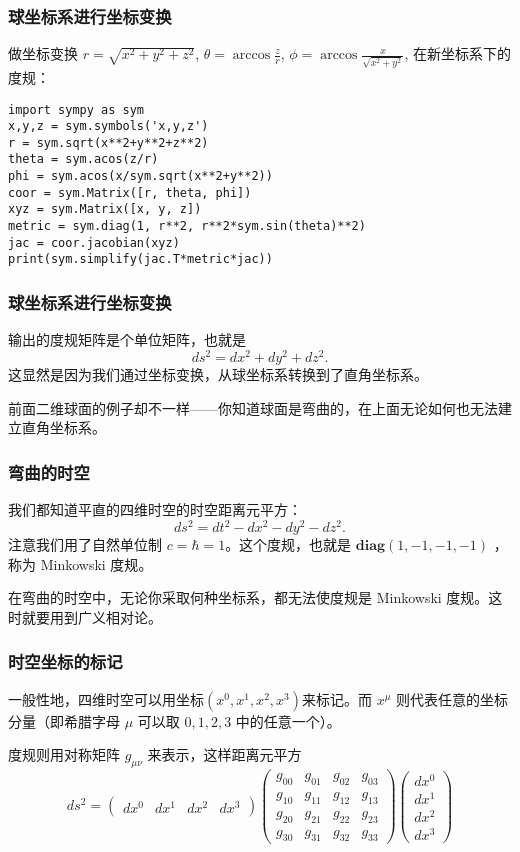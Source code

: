 \documentclass[CJK,13pt]{beamer}
\begin{document}
\begin{frame}[fragile]
  \frametitle{球坐标系进行坐标变换}
  做坐标变换 $r=\sqrt{x^2+y^2+z^2}$, $\theta=\arccos\frac{z}{r}$, $\phi=\arccos\frac{x}{\sqrt{x^2+y^2}}$, 在新坐标系下的度规：
  
\begin{verbatim}
import sympy as sym
x,y,z = sym.symbols('x,y,z') 
r = sym.sqrt(x**2+y**2+z**2)
theta = sym.acos(z/r)
phi = sym.acos(x/sym.sqrt(x**2+y**2))
coor = sym.Matrix([r, theta, phi])
xyz = sym.Matrix([x, y, z])
metric = sym.diag(1, r**2, r**2*sym.sin(theta)**2)
jac = coor.jacobian(xyz) 
print(sym.simplify(jac.T*metric*jac))
\end{verbatim}        
\ecode
\end{frame}



\begin{frame}
  \frametitle{球坐标系进行坐标变换}
  输出的度规矩阵是个单位矩阵，也就是
  $$ds^2=dx^2+dy^2+dz^2.$$
  这显然是因为我们通过坐标变换，从球坐标系转换到了直角坐标系。

  \skipline
  
  前面二维球面的例子却不一样——你知道球面是弯曲的，在上面无论如何也无法建立直角坐标系。
\end{frame}



\begin{frame}
  \frametitle{弯曲的时空}
  我们都知道平直的四维时空的时空距离元平方：
  $$ ds^2 = dt^2 - dx^2-dy^2-dz^2 .$$
  注意我们用了自然单位制 $c=\hbar=1$。这个度规，也就是 $\mathbf{diag}(1,-1,-1,-1)$ ，称为 {\blue Minkowski 度规}。
  

  \skiplines
  
  在弯曲的时空中，无论你采取何种坐标系，都无法使度规是 Minkowski 度规。这时就要用到{\blue 广义相对论}。
\end{frame}


\begin{frame}
\frametitle{ 时空坐标的标记}
一般性地，四维时空可以用坐标$(x^0, x^1, x^2, x^3)$来标记。而 $x^\mu$ 则代表任意的坐标分量（即希腊字母 $\mu$ 可以取 $0,1,2,3$ 中的任意一个）。


度规则用对称矩阵 $g_{\mu\nu}$ 来表示，这样距离元平方
$$ds^2=\begin{pmatrix}dx^0 & dx^1 & dx^2 & dx^3 \end{pmatrix}
\begin{pmatrix}
  g_{00} & g_{01} & g_{02} & g_{03} \\
  g_{10} & g_{11} & g_{12} & g_{13} \\
  g_{20} & g_{21} & g_{22} & g_{23} \\
  g_{30} & g_{31} & g_{32} & g_{33}
\end{pmatrix}
\begin{pmatrix}
  dx^0 \\
  dx^1 \\
  dx^2 \\
  dx^3
\end{pmatrix} $$
\end{frame}
\end{document}
